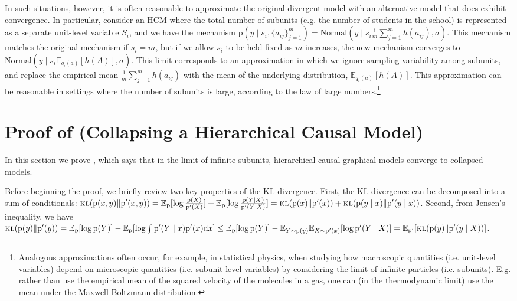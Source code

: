 \documentclass[12pt]{article}
\newcommand{\di}{\mathrm{d}}
\newcommand{\pr}{\mathrm{p}}
\begin{document}
In such situations, however, it is often reasonable to approximate the original divergent model with an alternative model that does exhibit convergence.
In particular, consider an HCM where the total number of subunits (e.g. the number of students in the school) is represented as a separate unit-level variable $S_i$, and we have the mechanism $\pr(y \mid s_i, \{a_{ij}\}_{j=1}^m) = \mathrm{Normal}(y \mid s_i \frac{1}{m} \sum_{j=1}^m h(a_{ij}), \sigma)$.
This mechanism matches the original mechanism if $s_i = m$, but if we allow $s_i$ to be held fixed as $m$ increases, the new mechanism converges to $\mathrm{Normal}(y \mid s_i \mathbb{E}_{q_i(a)} [h(A)], \sigma)$.
This limit corresponds to an approximation in which we ignore sampling variability among subunits, and replace the empirical mean $\frac{1}{m}\sum_{j=1}^m h(a_{ij})$ with the mean of the underlying distribution, $\mathbb{E}_{q_i(a)} [h(A)]$.
This approximation can be reasonable in settings where the number of subunits is large, according to the law of large numbers.\footnote{Analogous approximations often occur, for example, in statistical physics, when studying how macroscopic quantities (i.e. unit-level variables) depend on microscopic quantities (i.e. subunit-level variables) by considering the limit of infinite particles (i.e. subunits). E.g. rather than use the empirical mean of the squared velocity of the molecules in a gas, one can (in the thermodynamic limit) use the mean under the Maxwell-Boltzmann distribution. }
 \section{Proof of  (Collapsing a Hierarchical Causal Model)} \label{appx:collapsing}

In this section we prove , which says that in the limit of infinite subunits, hierarchical causal graphical models converge to collapsed models.

Before beginning the proof, we briefly review two key properties of the KL divergence.
First, the KL divergence can be decomposed into a sum of conditionals: $\textsc{kl}(\pr(x, y) \| \pr'(x, y)) = \mathbb{E}_{\pr}[\log\frac{\pr(X)}{\pr'(X)}] + \mathbb{E}_{\pr}[\log\frac{\pr(Y \mid X)}{\pr'(Y \mid X)}] = \textsc{kl}(\pr(x) \| \pr'(x)) + \textsc{kl}(\pr(y \mid x) \| \pr'(y \mid x))$.
Second, from Jensen's inequality, we have $\textsc{kl}(\pr(y) \| \pr'(y)) = \mathbb{E}_{\pr}[\log \pr(Y)] - \mathbb{E}_{\pr}[\log \int \pr'(Y \mid x) \pr'(x) \di x] \le \mathbb{E}_{\pr}[\log \pr(Y)] - \mathbb{E}_{Y \sim \pr(y)} \mathbb{E}_{X \sim \pr'(x)} [\log \pr'(Y \mid X)] = \mathbb{E}_{\pr'}[\textsc{kl}(\pr(y) \| \pr'(y \mid X))]$.
\end{document}
